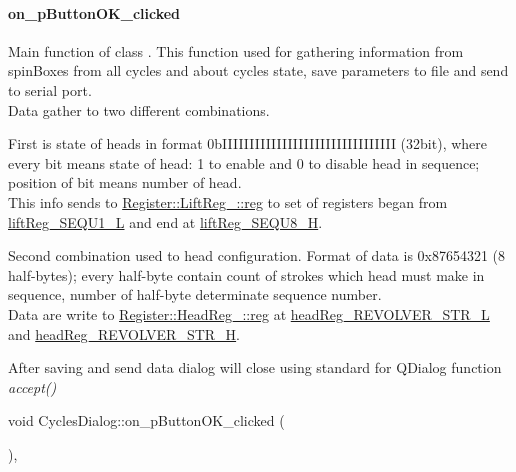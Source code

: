\paragraph{\texorpdfstring{on\+\_\+p\+Button\+O\+K\+\_\+clicked}{on\_pButtonOK\_clicked}}
Main function of class \hypertarget{classCyclesDialog}{}. This function used for gathering information from spinBoxes from all cycles and about cycles state, save parameters to file and send to serial port.\\
Data gather to two different combinations. 
\begin{DoxyCompactItemize}{ }
	\item First is state of heads in format 0bIIIIIIIIIIIIIIIIIIIIIIIIIIIIIIII (32bit), where every bit means state of head: 1 to enable and 0 to disable head in sequence; position of bit means number of head.\\ 
	This info sends to \hyperlink{structRegister_1_1LiftReg___1_1reg}{Register\+::\+Lift\+Reg\+\_\+\+::reg} to set of registers began from  \mbox{\hyperlink{structRegister_1_1LiftReg___1_1reg_a648684417d8dc08e4dc3b47c76a5079e}{lift\+Reg\+\_\+\+S\+E\+Q\+U1\+\_\+L}} and end at \mbox{\hyperlink{structRegister_1_1LiftReg___1_1reg_ab449e1df8be6232b89c3c938830e2b10}{lift\+Reg\+\_\+\+S\+E\+Q\+U8\+\_\+H}}.
	\item Second combination used to head configuration. Format of data is 0x87654321 (8 half-bytes); every half-byte contain count of strokes which head must make in sequence, number of half-byte determinate sequence number. \\
	Data are write to  \mbox{\hyperlink{structRegister_1_1HeadReg___1_1reg}{Register\+::\+Head\+Reg\+\_\+\+::reg}} at \mbox{\hyperlink{structRegister_1_1HeadReg___1_1reg_aba8016656488d0408a6230a7849f3720}{head\+Reg\+\_\+\+R\+E\+V\+O\+L\+V\+E\+R\+\_\+\+S\+T\+R\+\_\+L}} and \mbox{\hyperlink{structRegister_1_1HeadReg___1_1reg_ac641be5b0b57efa13ba8a575497693c9}{head\+Reg\+\_\+\+R\+E\+V\+O\+L\+V\+E\+R\+\_\+\+S\+T\+R\+\_\+H}}. \\
\end{DoxyCompactItemize}
After saving and send data dialog will close using standard for Q\+Dialog function \textit{accept()}\\
{\footnotesize\ttfamily void Cycles\+Dialog\+::on\+\_\+p\+Button\+O\+K\+\_\+clicked (\begin{DoxyParamCaption}{ }\end{DoxyParamCaption}){\ttfamily [private]}, {\ttfamily [slot]}}

\mbox{\label{classCyclesDialog_a43494fe7c65472212974a7be28a31d3d}} 
